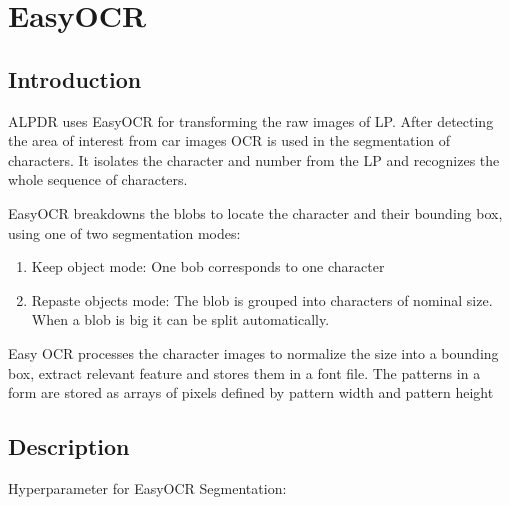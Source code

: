%
%


\chapter{EasyOCR}


\section{Introduction}

\ac{ALPDR} uses EasyOCR for transforming the raw images of LP. After detecting the area of interest from car images OCR is used in the segmentation of characters. It isolates the character and number from the LP and recognizes the whole sequence of characters.


EasyOCR breakdowns the blobs to locate the character and their bounding box, using one of two segmentation modes:

\begin{enumerate}
	\item Keep object mode: One bob corresponds to one character
	\item Repaste objects mode: The blob is grouped into characters of nominal size. When a blob is big it can be split automatically.
\end{enumerate}

Easy OCR processes the character images to normalize the size into a bounding box, extract relevant feature and stores them in a font file. The patterns in a form are stored as arrays of pixels defined by pattern width and pattern height

\section{Description}

Hyperparameter for EasyOCR Segmentation: \cite{OpeneVision:2018}

